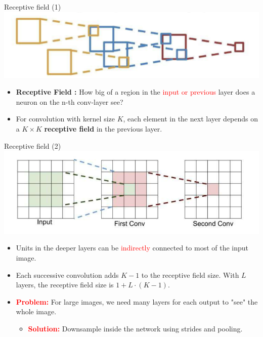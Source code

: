 \documentclass[default, aspectratio=169]{beamer}
\begin{document}
	\begin{frame}{Receptive field (1)}
		\centering
		\includegraphics[keepaspectratio, scale=0.6]{pic/receptive1.png}
		\smallskip
		\begin{itemize}
			\item \textbf{Receptive Field :} How big of a region in the \textcolor{red}{input or previous} layer does a neuron on the n-th conv-layer see?
			\item For convolution with kernel size $K$, each element in the next layer depends on a $K \times K$ \textbf{receptive field} in the previous layer.
		\end{itemize}
	\end{frame}	
	\begin{frame}{Receptive field (2)}
		\centering
		\includegraphics[keepaspectratio, scale=0.6]{pic/receptive.png}
		\smallskip
		\begin{itemize}
			\item Units in the deeper layers can be \textcolor{red}{indirectly} connected to most of the input image.
			\item Each successive convolution adds $K - 1$ to the receptive field size. With $L$ layers, the receptive field size is $1 + L \cdot (K - 1)$.
			\item \textcolor{red}{\textbf{Problem:}} For large images, we need many layers for each output to "see" the whole image.
			\begin{itemize}
				\item \textcolor{red}{\textbf{Solution:}} Downsample inside the network using strides and pooling.
			\end{itemize}
		\end{itemize}
	\end{frame}
\end{document}
